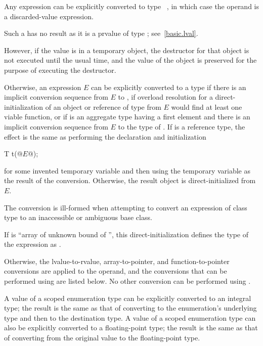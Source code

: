 \pnum
Any expression can be explicitly converted to type \cv{}~,
in which case the operand is a discarded-value expression.
\begin{note}
Such a  has no result
as it is a prvalue of type ; see~\ref{basic.lval}.
\end{note}
\begin{note}
However, if the value is in a temporary
object, the destructor for that
object is
not executed until the usual time, and the value of the object is
preserved for the purpose of executing the destructor.
\end{note}

\pnum
Otherwise, an expression $E$ can be explicitly converted to a type 
if there is an implicit conversion sequence
from $E$ to ,
if overload resolution for a direct-initialization
of an object or reference of type  from $E$
would find at least one viable function, or
if  is an aggregate type
having a first element  and
there is an implicit conversion sequence
from $E$ to the type of .
If  is a reference type, the effect is
the same as performing the declaration and initialization
\begin{codeblock}
T t(@$E$@);
\end{codeblock}
for some invented temporary variable 
and then using the temporary variable as the result of the conversion.
Otherwise, the result object is direct-initialized from $E$.
\begin{note}
The conversion is ill-formed when attempting to convert an
expression of class type to an inaccessible or ambiguous base class.
\end{note}
\begin{note}
If  is ``array of unknown bound of '',
this direct-initialization defines the type of the expression as .
\end{note}

\pnum
Otherwise, the lvalue-to-rvalue,
array-to-pointer, and
function-to-pointer conversions are applied to the
operand, and the conversions that can be performed using  are listed below.
No other conversion can be performed using .

\pnum
A value of a scoped enumeration type
can be explicitly converted to an integral type;
the result is the same as that of converting
to the enumeration's underlying type and then to the destination type.
A value of a scoped enumeration type
can also be explicitly converted to a floating-point type;
the result is the same as that of converting
from the original value to the floating-point type.

